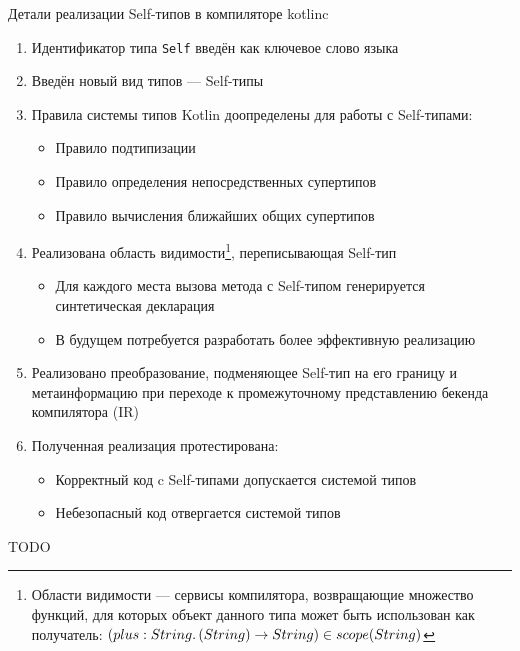 \documentclass[usenames, dvipsnames]{beamer}
\begin{document}
\begin{frame}{Детали реализации Self-типов в компиляторе kotlinc}
        \begin{enumerate}
            \item Идентификатор типа \texttt{Self} введён как ключевое слово языка
            \item Введён новый вид типов --- Self-типы
            \item Правила системы типов Kotlin доопределены для работы с Self-типами:
            \begin{itemize}
                \item Правило подтипизации
                \item Правило определения непосредственных супертипов
                \item Правило вычисления ближайших общих супертипов
            \end{itemize}
            \item Реализована область видимости\footnote{Области видимости --- сервисы компилятора, возвращающие множество функций, для которых объект данного типа может быть использован как получатель: $(plus : String\ldotp(String) \to String) \in scope(String)$}, переписывающая Self-тип
            \begin{itemize}
                \item Для каждого места вызова метода с Self-типом генерируется синтетическая декларация
                \item В будущем потребуется разработать более эффективную реализацию
            \end{itemize}
            \item Реализовано преобразование, подменяющее Self-тип на его границу и метаинформацию при переходе к промежуточному представлению бекенда компилятора (IR)
            \item Полученная реализация протестирована:
            \begin{itemize}
                \item Корректный код c Self-типами допускается системой типов
                \item Небезопасный код отвергается системой типов
            \end{itemize}
        \end{enumerate}
    \end{frame}

    \begin{frame}{}
        TODO %
    \end{frame}
\end{document}
